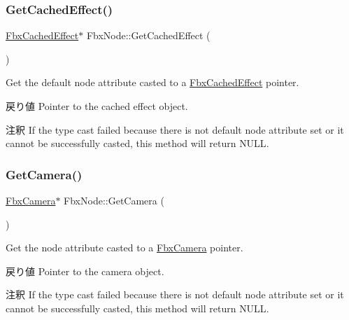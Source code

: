 \mbox{\label{class_fbx_node_a1cb6d216af155fc50e4b3d3acbbfdb4b}} 
\subsubsection{\texorpdfstring{Get\+Cached\+Effect()}{GetCachedEffect()}}
{\footnotesize\ttfamily \hyperlink{class_fbx_cached_effect}{Fbx\+Cached\+Effect}$\ast$ Fbx\+Node\+::\+Get\+Cached\+Effect (\begin{DoxyParamCaption}{ }\end{DoxyParamCaption})}

Get the default node attribute casted to a \hyperlink{class_fbx_cached_effect}{Fbx\+Cached\+Effect} pointer. \begin{DoxyReturn}{戻り値}
Pointer to the cached effect object. 
\end{DoxyReturn}
\begin{DoxyRemark}{注釈}
If the type cast failed because there is not default node attribute set or it cannot be successfully casted, this method will return {\ttfamily N\+U\+LL}. 
\end{DoxyRemark}
\mbox{\label{class_fbx_node_aac6f56442ef532b516c7d404e1528366}} 
\subsubsection{\texorpdfstring{Get\+Camera()}{GetCamera()}\hspace{0.1cm}{\footnotesize\ttfamily [1/2]}}
{\footnotesize\ttfamily \hyperlink{class_fbx_camera}{Fbx\+Camera}$\ast$ Fbx\+Node\+::\+Get\+Camera (\begin{DoxyParamCaption}{ }\end{DoxyParamCaption})}

Get the node attribute casted to a \hyperlink{class_fbx_camera}{Fbx\+Camera} pointer. \begin{DoxyReturn}{戻り値}
Pointer to the camera object. 
\end{DoxyReturn}
\begin{DoxyRemark}{注釈}
If the type cast failed because there is not default node attribute set or it cannot be successfully casted, this method will return {\ttfamily N\+U\+LL}. 
\end{DoxyRemark}
\mbox{\label{class_fbx_node_a8c852806c2a5381eb435639efc30518d}} 
